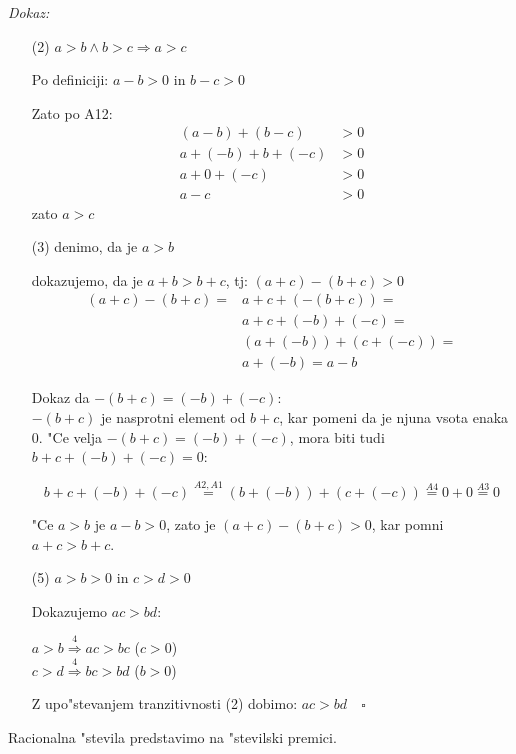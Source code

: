 \emph{Dokaz:}
\begin{enumerate}
	\item[(2)] \(a > b \land b > c \Rightarrow a > c\)
	
	Po definiciji: \(a - b > 0\) in \(b - c > 0\)
	
	Zato po A12:
	\begin{align*}
		(a -b) + (b -c) &> 0\\
		a + (-b) + b + (-c) &> 0\\
		a + 0 + (-c) &> 0 \\
		a - c &> 0
	\end{align*}
	zato \(a > c\)
	
	\item[(3)] denimo, da je \(a > b\)
	
	dokazujemo, da je \(a + b > b + c\), tj: \((a + c) - (b + c) > 0\)
	\begin{align*}
		(a + c) - (b + c) = &a + c + (-(b + c)) =\\
		&a + c + (-b) + (-c) = \\
		&(a + (-b)) + (c + (-c)) =\\
		&a + (-b) = a - b
	\end{align*}
	\begin{adjustwidth}{24pt}{0pt}
		Dokaz da \(-(b + c) = (-b) + (-c)\):\\
		\hspace*{12pt}\(-(b + c)\) je nasprotni element od \(b + c\), kar pomeni da je njuna vsota enaka \(0\). "Ce velja \(-(b + c) = (-b) + (-c)\), mora biti tudi \(b + c + (-b) + (-c) = 0\):
	\end{adjustwidth}
	\[b + c + (-b) + (-c) \stackrel{A2, A1}{=} (b + (-b)) + (c + (-c)) \stackrel{A4}{=} 0 + 0 \stackrel{A3}{=} 0\]
	
	"Ce \(a > b\) je \(a - b > 0\), zato je \((a + c) - (b + c) > 0\), kar pomni \(a + c > b + c\).
	
	\item[(5)] \(a > b > 0\) in \(c > d > 0\)
	
	Dokazujemo \(ac > bd\):
	
	\(a > b \stackrel{4}{\Rightarrow} ac > bc\) (\(c > 0\))\\
	\(c > d \stackrel{4}{\Rightarrow} bc > bd\) (\(b > 0\))
	
	Z upo"stevanjem tranzitivnosti (2) dobimo: \(ac > bd \quad \square \)
\end{enumerate}

Racionalna "stevila predstavimo na "stevilski premici.

